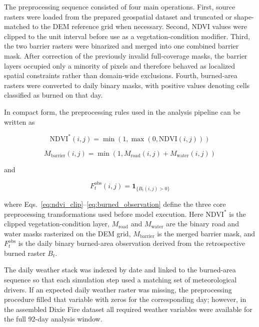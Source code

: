 \documentclass[10pt,letterpaper]{article}
\begin{document}
The preprocessing sequence consisted of four main operations. First,
source rasters were loaded from the prepared geospatial dataset and
truncated or shape-matched to the DEM reference grid when necessary.
Second, NDVI values were clipped to the unit interval before use as a
vegetation-condition modifier. Third, the two barrier rasters
were binarized and merged into one combined barrier mask. After
correction of the previously invalid full-coverage masks, the barrier
layers occupied only a minority of pixels and therefore behaved as
localized spatial constraints rather than domain-wide exclusions.
Fourth, burned-area rasters were converted to daily binary masks, with
positive values denoting cells classified as burned on that day.

In compact form, the preprocessing rules used in the analysis
pipeline can be written as

\begin{equation}
\mathrm{NDVI}^{\ast}(i,j)=\min\left(1,\max\left(0,\mathrm{NDVI}(i,j)\right)\right)
\label{eq:ndvi_clip}
\end{equation}

\begin{equation}
M_{\mathrm{barrier}}(i,j)=\min\left(1,M_{\mathrm{road}}(i,j)+M_{\mathrm{water}}(i,j)\right)
\label{eq:barrier_merge}
\end{equation}

and

\begin{equation}
F_t^{\mathrm{obs}}(i,j)=\mathbf{1}_{\{B_t(i,j)>0\}}
\label{eq:burned_observation}
\end{equation}

where Eqs.~\ref{eq:ndvi_clip}--\ref{eq:burned_observation} define the
three core preprocessing transformations used before model execution.
Here $\mathrm{NDVI}^{\ast}$ is the clipped vegetation-condition layer,
$M_{\mathrm{road}}$ and $M_{\mathrm{water}}$ are the binary road and
water masks rasterized on the DEM grid, $M_{\mathrm{barrier}}$ is the
merged barrier mask, and $F_t^{\mathrm{obs}}$ is the daily binary
burned-area observation derived from the retrospective burned raster
$B_t$.

The daily weather stack was indexed by date and linked to the
burned-area sequence so that each simulation step used a matching set of
meteorological drivers. If an expected daily weather raster was missing,
the preprocessing procedure filled that variable with zeros for the
corresponding day; however, in the assembled Dixie Fire dataset all
required weather variables were available for the full 92-day analysis
window.
\end{document}
